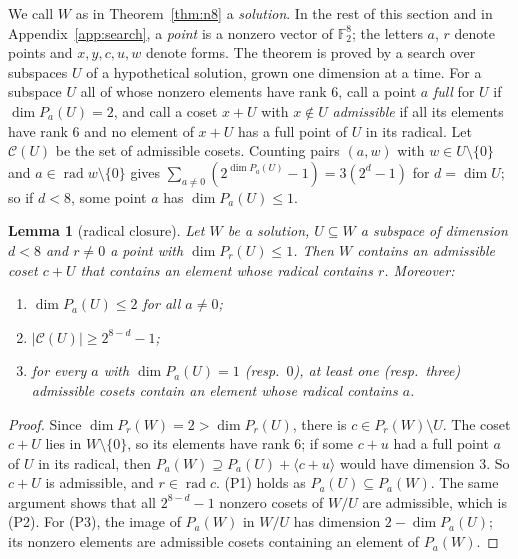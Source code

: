 \documentclass[11pt]{article}
\newtheorem{lemma}[theorem]{Lemma}
\theoremstyle{definition}
\newcommand{\F}{\mathbb{F}}
\DeclareMathOperator{\rad}{rad}
\begin{document}
We call $W$ as in Theorem~\ref{thm:n8} a \emph{solution}. In the rest of this section and in
Appendix~\ref{app:search}, a \emph{point} is a nonzero vector of $\F_2^8$; the letters $a$, $r$
denote points and $x,y,c,u,w$ denote forms. The theorem is proved by a search over
subspaces $U$ of a hypothetical solution, grown one dimension at a time. For a subspace $U$ all
of whose nonzero elements have rank $6$, call a point $a$ \emph{full} for $U$ if $\dim P_a(U)=2$, and
call a coset $x+U$ with $x\notin U$ \emph{admissible} if all its elements have rank $6$ and no
element of $x+U$ has a full point of $U$ in its radical. Let $\mathcal C(U)$ be the set of
admissible cosets. Counting pairs $(a,w)$ with $w\in U\setminus\{0\}$ and $a\in\rad w\setminus\{0\}$
gives $\sum_{a\neq0}(2^{\dim P_a(U)}-1)=3(2^d-1)$ for $d=\dim U$; so if $d<8$,
some point $a$ has $\dim P_a(U)\le1$.

\begin{lemma}[radical closure]\label{lem:closure}
Let $W$ be a solution, $U\subseteq W$ a subspace of dimension $d<8$ and $r\neq0$ a point with
$\dim P_r(U)\le1$. Then $W$ contains an admissible coset $c+U$ that contains an element whose
radical contains $r$. Moreover:
\begin{enumerate}
\item[(P1)] $\dim P_a(U)\le2$ for all $a\neq0$;
\item[(P2)] $|\mathcal C(U)|\ge 2^{8-d}-1$;
\item[(P3)] for every $a$ with $\dim P_a(U)=1$ (resp.\ $0$), at least one (resp.\ three)
admissible cosets contain an element whose radical contains $a$.
\end{enumerate}
\end{lemma}
\begin{proof}
Since $\dim P_r(W)=2>\dim P_r(U)$, there is $c\in P_r(W)\setminus U$. The coset $c+U$ lies in
$W\setminus\{0\}$, so its elements have rank $6$; if some $c+u$ had a full point $a$ of $U$ in
its radical, then $P_a(W)\supseteq P_a(U)+\langle c+u\rangle$ would have dimension $3$. So $c+U$
is admissible, and $r\in\rad c$. (P1) holds as $P_a(U)\subseteq P_a(W)$. The same argument shows
that all $2^{8-d}-1$ nonzero cosets of $W/U$ are admissible, which is (P2). For (P3), the image
of $P_a(W)$ in $W/U$ has dimension $2-\dim P_a(U)$; its nonzero elements are admissible cosets
containing an element of $P_a(W)$.
\end{proof}
\end{document}
